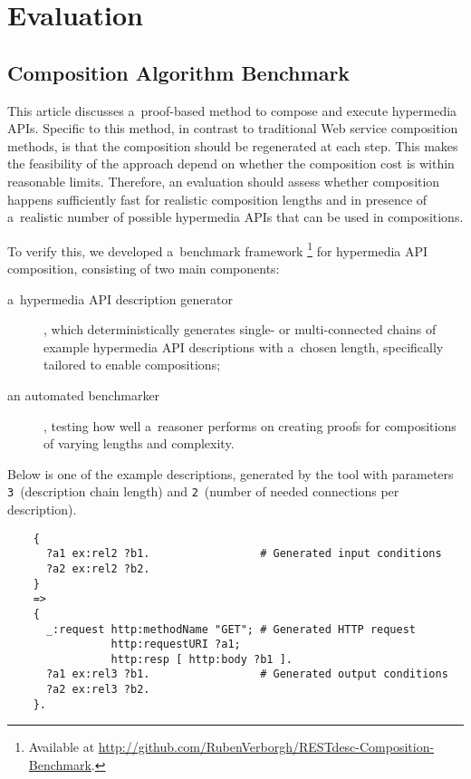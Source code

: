 \section{Evaluation}
\label{sec:Evaluation}
\subsection{Composition Algorithm Benchmark}
This article discusses a~proof-based method to compose and execute hypermedia APIs.
Specific to this method, in contrast to traditional Web service composition methods,
is that the composition should be regenerated at each step.
This makes the feasibility of the approach depend
on whether the composition cost is within reasonable limits.
Therefore, an evaluation should assess whether
composition happens sufficiently fast
for realistic composition lengths
and in presence of a~realistic number of possible hypermedia APIs
that can be used in compositions.

To verify this, we developed a~benchmark framework%
\footnote{Available at \url{http://github.com/RubenVerborgh/RESTdesc-Composition-Benchmark}.}
for hypermedia API composition,
consisting of two main components:
\begin{description}
\item[a~hypermedia API description generator]\hspace{-1ex},
which deterministically generates single- or multi-connected chains
of example hypermedia API descriptions with a~chosen length,
specifically tailored to enable compositions;
\item [an automated benchmarker]\hspace{-1ex},
testing how well a~reasoner performs
on creating proofs for compositions of varying lengths and complexity.
\end{description}

Below is one of the example descriptions,
generated by the tool with parameters \verb!3!~(description chain length)
and \verb!2!~(number of needed connections per description).
\begin{Verbatim}
    {
      ?a1 ex:rel2 ?b1.                 # Generated input conditions
      ?a2 ex:rel2 ?b2.
    }
    =>
    {
      _:request http:methodName "GET"; # Generated HTTP request
                http:requestURI ?a1;
                http:resp [ http:body ?b1 ].
      ?a1 ex:rel3 ?b1.                 # Generated output conditions
      ?a2 ex:rel3 ?b2.
    }.
\end{Verbatim}

